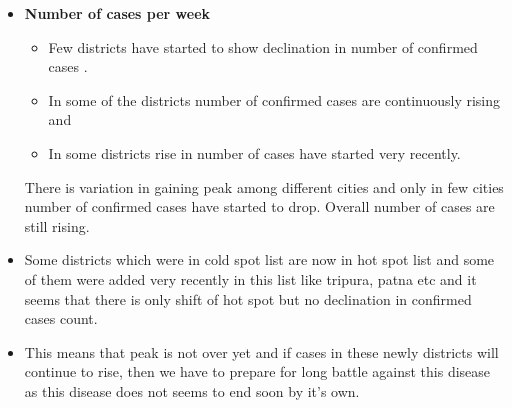 \documentclass{article}
\begin{document}
\begin{itemize}
    \vspace{5mm}
    \item \textbf{Number of cases per week}
    \begin{itemize}
        \item Few districts have started to show declination in number of confirmed cases .
        \item In some of the districts number of confirmed cases are continuously rising and
        \item In some districts rise in number of cases have started very recently.
    \end{itemize}
    
    There is variation in gaining peak among different cities and only in few cities number of confirmed cases have started to drop. Overall number of cases are still rising.
    
    \vspace{5mm}
    \item Some districts which were in cold spot list are now in hot spot list and some of them were added very recently in this list like tripura, patna etc and it seems that there is only shift of hot spot but no declination in confirmed cases count.
    
    \vspace{5mm}
    \item This means that peak is not over yet and if cases in these newly districts will continue to rise, then we have to prepare for long battle against this disease as this disease does not seems to end soon by it's own.
    
\end{itemize}
\end{document}
